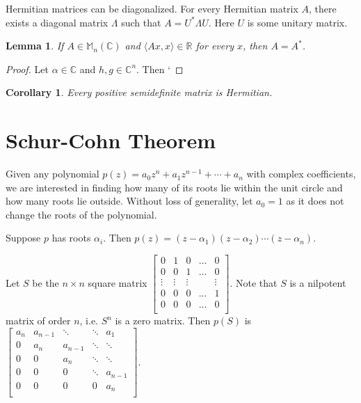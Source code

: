 \documentclass[twofold]{article}
\newcommand*\adj[1]{#1^*}
\theoremstyle{plain}
\newtheorem*{corollary}{Corollary}
\newtheorem*{lemma}{Lemma}
\theoremstyle{definition}
\begin{document}
Hermitian matrices can be diagonalized. For every Hermitian matrix \(A\), there exists a diagonal matrix \(\Lambda\) such that \(A = \adj{U}  \Lambda U\). Here \(U\) is some unitary matrix. 



\begin{lemma} If \(A \in \mathbb{M}_n (\mathbb{C})\) and \(\langle Ax, x \rangle \in \mathbb{R}\) for every \(x\), then \(A = \adj{A}\). \end{lemma}
\begin{proof} Let \(\alpha \in \mathbb{C}\) and \(h, g \in \mathbb{C}^n\). Then `\end{proof}

\begin{corollary}Every positive semidefinite matrix is Hermitian.\end{corollary}
\section{Schur-Cohn Theorem}

Given any polynomial \(p(z) = a_0 z^n + a_1z^{n-1} + \cdots + a_n\) with complex coefficients, we are interested in finding how many of its roots lie within the unit circle and how many roots lie outside. Without loss of generality, let \(a_0 = 1\) as it does not change the roots of the polynomial. 

Suppose \(p\) has roots \(\alpha_i\). Then \(p(z) = (z - \alpha_1) (z - \alpha_2) \cdots (z - \alpha_n)\). 


Let \(S\) be the \(n \times n\) square matrix \( \begin{bmatrix} 
0 & 1 & 0 & \ldots & 0 \\
0 & 0 & 1 & \ldots & 0 \\
\vdots & \vdots & \vdots & & \vdots \\
0 & 0 & 0 &\ldots & 1 \\
0 & 0 & 0 & \ldots & 0 \\ 
\end{bmatrix}\).  Note that \(S\) is a nilpotent matrix of order \(n\), i.e. \(S^n\) is a zero matrix. Then \(p(S) \) is \( \begin{bmatrix} 

a_n & a_{n-1} & \ddots & \ddots & a_1 \\
0 & a_n & a_{n-1} & \ddots & \ddots \\
0 & 0 & a_n & \ddots & \ddots \\
0 & 0 & 0 &\ddots & a_{n-1} \\
0 & 0 & 0 & 0 & a_n \\ 
\end{bmatrix}\). 
\end{document}
